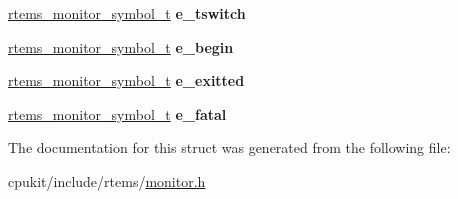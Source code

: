\begin{DoxyCompactItemize}
\item 
\mbox{\label{structrtems__monitor__extension__t_a0f5a57b16157785e04168934fbae93e0}} 
\mbox{\hyperlink{structrtems__monitor__symbol__t}{rtems\+\_\+monitor\+\_\+symbol\+\_\+t}} {\bfseries e\+\_\+tswitch}
\item 
\mbox{\label{structrtems__monitor__extension__t_a0409ef4604ac6942278533810d967eb1}} 
\mbox{\hyperlink{structrtems__monitor__symbol__t}{rtems\+\_\+monitor\+\_\+symbol\+\_\+t}} {\bfseries e\+\_\+begin}
\item 
\mbox{\label{structrtems__monitor__extension__t_a7b099eb11ff7c1fac6bae11bd6d0081b}} 
\mbox{\hyperlink{structrtems__monitor__symbol__t}{rtems\+\_\+monitor\+\_\+symbol\+\_\+t}} {\bfseries e\+\_\+exitted}
\item 
\mbox{\label{structrtems__monitor__extension__t_ab44f3e4352ecbf23cf8e5bf4ae7b21e7}} 
\mbox{\hyperlink{structrtems__monitor__symbol__t}{rtems\+\_\+monitor\+\_\+symbol\+\_\+t}} {\bfseries e\+\_\+fatal}
\end{DoxyCompactItemize}


The documentation for this struct was generated from the following file\+:\begin{DoxyCompactItemize}
\item 
cpukit/include/rtems/\mbox{\hyperlink{monitor_8h}{monitor.\+h}}\end{DoxyCompactItemize}
